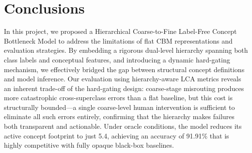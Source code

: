 \documentclass[sigconf, nonacm]{acmart}
\begin{document}
\section{Conclusions}
In this project, we proposed a Hierarchical Coarse-to-Fine Label-Free Concept Bottleneck Model to address the limitations of flat CBM representations and evaluation strategies. By embedding a rigorous dual-level hierarchy spanning both class labels and conceptual features, and introducing a dynamic hard-gating mechanism, we effectively bridged the gap between structural concept definitions and model inference. Our evaluation using hierarchy-aware LCA metrics reveals an inherent trade-off of the hard-gating design: coarse-stage misrouting produces more catastrophic cross-superclass errors than a flat baseline, but this cost is structurally bounded---a single coarse-level human intervention is sufficient to eliminate all such errors entirely, confirming that the hierarchy makes failures both transparent and actionable. Under oracle conditions, the model reduces its active concept footprint to just 5.4, achieving an accuracy of 91.91\% that is highly competitive with fully opaque black-box baselines.



\end{document}

